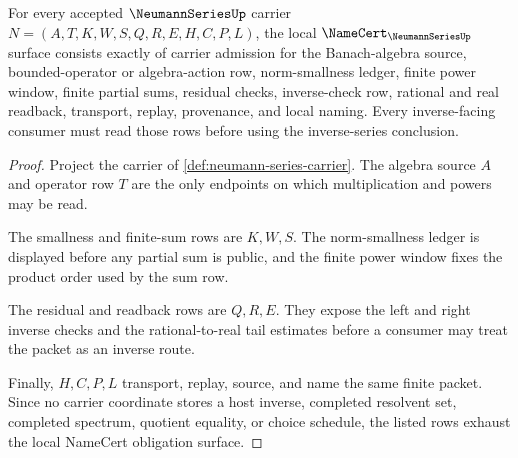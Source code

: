 \begin{theorem}
\label{thm:neumann-series-namecert-obligations}
For every accepted $\NeumannSeriesUp$ carrier $N=(A,T,K,W,S,Q,R,E,H,C,P,L)$, the local $\NameCert_{\NeumannSeriesUp}$ surface consists exactly of carrier admission for the Banach-algebra source, bounded-operator or algebra-action row, norm-smallness ledger, finite power window, finite partial sums, residual checks, inverse-check row, rational and real readback, transport, replay, provenance, and local naming. Every inverse-facing consumer must read those rows before using the inverse-series conclusion.
\end{theorem}
\begin{proof}
Project the carrier of \autoref{def:neumann-series-carrier}. The algebra source $A$ and operator row $T$ are the only endpoints on which multiplication and powers may be read.

The smallness and finite-sum rows are $K,W,S$. The norm-smallness ledger is displayed before any partial sum is public, and the finite power window fixes the product order used by the sum row.

The residual and readback rows are $Q,R,E$. They expose the left and right inverse checks and the rational-to-real tail estimates before a consumer may treat the packet as an inverse route.

Finally, $H,C,P,L$ transport, replay, source, and name the same finite packet. Since no carrier coordinate stores a host inverse, completed resolvent set, completed spectrum, quotient equality, or choice schedule, the listed rows exhaust the local NameCert obligation surface.
\end{proof}

